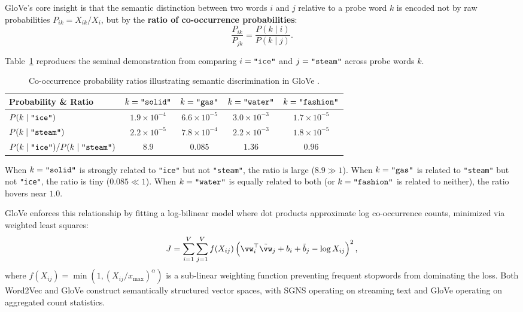 \documentclass[../../main.tex]{subfiles}
\begin{document}
GloVe's core insight is that the semantic distinction between two words $i$ and $j$ relative to a probe word $k$ is encoded not by raw probabilities $P_{ik} = X_{ik}/X_i$, but by the \textbf{ratio of co-occurrence probabilities}:
\begin{equation}
\label{eq:glove_ratio}
\frac{P_{ik}}{P_{jk}} = \frac{P(k \mid i)}{P(k \mid j)}.
\end{equation}

Table~\ref{tab:glove_ratio} reproduces the seminal demonstration from \cite{pennington2014glove} comparing $i = \text{\texttt{"ice"}}$ and $j = \text{\texttt{"steam"}}$ across probe words $k$.

\begin{table}[htbp]
\centering
\small
\caption{Co-occurrence probability ratios illustrating semantic discrimination in GloVe \cite{pennington2014glove}.}
\label{tab:glove_ratio}
\begin{tabular}{lcccc}
\toprule
\textbf{Probability \& Ratio} & $k = \text{\texttt{"solid"}}$ & $k = \text{\texttt{"gas"}}$ & $k = \text{\texttt{"water"}}$ & $k = \text{\texttt{"fashion"}}$ \\
\midrule
$P(k \mid \text{\texttt{"ice"\/}})$ & $1.9 \times 10^{-4}$ & $6.6 \times 10^{-5}$ & $3.0 \times 10^{-3}$ & $1.7 \times 10^{-5}$ \\
$P(k \mid \text{\texttt{"steam"\/}})$ & $2.2 \times 10^{-5}$ & $7.8 \times 10^{-4}$ & $2.2 \times 10^{-3}$ & $1.8 \times 10^{-5}$ \\
\midrule
$P(k \mid \text{\texttt{"ice"\/}}) / P(k \mid \text{\texttt{"steam"\/}})$ & $\mathbf{8.9}$ & $\mathbf{0.085}$ & $1.36$ & $0.96$ \\
\bottomrule
\end{tabular}
\end{table}

When $k = \text{\texttt{"solid"}}$ is strongly related to \texttt{"ice"} but not \texttt{"steam"}, the ratio is large ($8.9 \gg 1$). When $k = \text{\texttt{"gas"}}$ is related to \texttt{"steam"} but not \texttt{"ice"}, the ratio is tiny ($0.085 \ll 1$). When $k = \text{\texttt{"water"}}$ is equally related to both (or $k = \text{\texttt{"fashion"}}$ is related to neither), the ratio hovers near $1.0$.

GloVe enforces this relationship by fitting a log-bilinear model where dot products approximate log co-occurrence counts, minimized via weighted least squares:
\begin{equation}
\label{eq:glove_loss}
J = \sum_{i=1}^V \sum_{j=1}^V f(X_{ij}) \left( \vw_i^\top \tilde{\vw}_j + b_i + \tilde{b}_j - \log X_{ij} \right)^2,
\end{equation}
where $f(X_{ij}) = \min(1, (X_{ij}/x_{\max})^\alpha)$ is a sub-linear weighting function preventing frequent stopwords from dominating the loss. Both Word2Vec and GloVe construct semantically structured vector spaces, with SGNS operating on streaming text and GloVe operating on aggregated count statistics.
\end{document}
